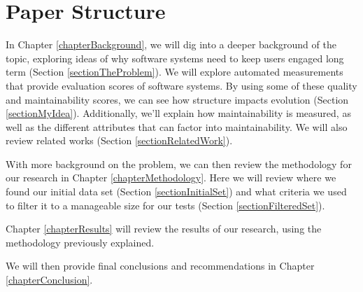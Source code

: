 \section{Paper Structure}


In Chapter \ref{chapterBackground}, we will dig into a deeper background of the topic, exploring ideas of why software systems need to keep users engaged long term (Section \ref{sectionTheProblem}). We will explore automated measurements that provide evaluation scores of software systems. By using some of these quality and maintainability scores, we can see how structure impacts evolution (Section \ref{sectionMyIdea}). Additionally, we'll explain how maintainability is measured, as well as the different attributes that can factor into maintainability. We will also review related works (Section \ref{sectionRelatedWork}).


With more background on the problem, we can then review the methodology for our research in Chapter \ref{chapterMethodology}. Here we will review where we found our initial data set (Section \ref{sectionInitialSet}) and what criteria we used to filter it to a manageable size for our tests (Section \ref{sectionFilteredSet}).


Chapter \ref{chapterResults} will review the results of our research, using the methodology previously explained. 


We will then provide final conclusions and recommendations in Chapter \ref{chapterConclusion}. 

